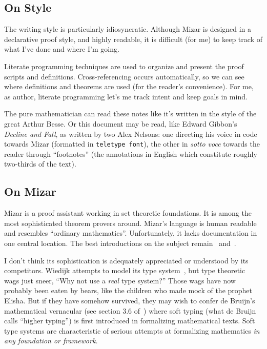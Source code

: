 
\subsection*{On Style}
The writing style is particularly idiosyncratic. Although Mizar is
designed in a declarative proof style, and highly readable, it is
difficult (for me) to keep track of what I've done and where I'm going.

Literate programming techniques are used to organize and present the
proof scripts and definitions. Cross-referencing occurs automatically,
so we can see where definitions and theorems are used (for the reader's
convenience). For me, as author, literate programming let's me track
intent and keep goals in mind.

The pure mathematician can read these notes like it's written in the
style of the great Arthur Besse. Or this document may be read, like
Edward Gibbon's
\emph{Decline and Fall}, as written by two Alex Nelsons: one directing
his voice in code towards Mizar (formatted in \verb#teletype font#), the
other in \emph{sotto voce} towards the reader through ``footnotes'' (the
annotations in English which constitute roughly two-thirds of the text).

\subsection*{On Mizar}
Mizar is a proof assistant working in set theoretic foundations. It is
among the most sophisticated theorem provers around. Mizar's language is
human readable and resembles ``ordinary mathematics''. Unfortunately, it
lacks documentation in one central location. The best introductions on
the subject remain~\cite{grabowski2010mizar} and~\cite{wiedijk2006mizman}.

I don't think its sophistication is adequately appreciated or understood
by its competitors. Wiedijk attempts to model its type
system~\cite{wiedijk2007mizar}, but type theoretic wags just sneer,
``Why not use a \emph{real} type system?'' Those wags have now probably been eaten
by bears, like the children who made mock of the prophet Elisha. But if
they have somehow survived, they may wish to confer de Bruijn's mathematical
vernacular (see section {3.6} of~\cite{de1994mathematical}) where soft
typing (what de Bruijn calls ``higher typing'') is first introduced in
formalizing mathematical texts. Soft type systems are characteristic of
serious attempts at formalizing mathematics \emph{in any foundation or framework.}

